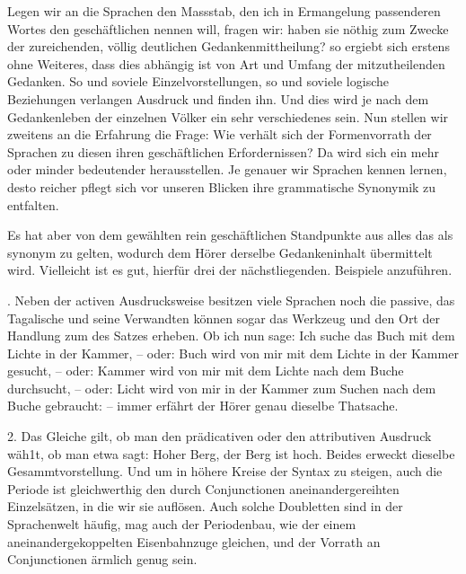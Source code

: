 Legen wir an die Sprachen den Massstab, den ich in Ermangelung  passenderen Wortes den geschäftlichen nennen will, fragen wir:  haben \label{sp.363} sie nöthig zum Zwecke der zureichenden, völlig deutlichen Gedankenmittheilung? so ergiebt sich erstens ohne Weiteres, dass dies abhängig ist von Art und Umfang der mitzutheilenden Gedanken. So und soviele Einzelvorstellungen, so und soviele logische Beziehungen verlangen Ausdruck und finden ihn. Und dies  wird je nach dem Gedankenleben der einzelnen Völker ein sehr verschiedenes sein. Nun stellen wir zweitens an die Erfahrung die Frage: Wie verhält sich der Formenvorrath der Sprachen zu diesen ihren geschäftlichen Erfordernissen? Da wird sich ein mehr oder minder bedeutender  herausstellen. Je genauer wir Sprachen kennen lernen, desto reicher pflegt sich vor unseren Blicken ihre grammatische Synonymik zu entfalten.

Es hat aber von dem gewählten rein geschäftlichen Standpunkte aus alles das als synonym zu gelten, wodurch dem Hörer derselbe Gedankeninhalt übermittelt wird. Vielleicht ist es gut, hierfür drei der nächstliegenden. Beispiele anzuführen.

. Neben der activen Ausdrucksweise besitzen viele Sprachen noch die passive, das Tagalische und seine Verwandten können sogar das Werkzeug und den Ort der Handlung zum  des Satzes erheben. Ob ich nun sage: Ich suche das Buch mit dem Lichte in der Kammer, – oder:  Buch wird von mir mit dem Lichte in der Kammer gesucht, – oder:  Kammer wird von mir mit dem Lichte nach dem Buche durchsucht, – oder:  Licht wird von mir in der Kammer zum Suchen nach dem Buche gebraucht: – immer erfährt der Hörer genau dieselbe Thatsache.

2. Das Gleiche gilt, ob man den prädicativen oder den attributiven Ausdruck wäh1t, ob man etwa sagt: Hoher Berg,  der Berg ist hoch. Beides erweckt dieselbe Gesammtvorstellung. Und um in höhere Kreise der Syntax zu steigen,  auch die Periode ist gleichwerthig den durch Conjunctionen aneinandergereihten Einzelsätzen, in die wir sie auflösen. Auch solche Doubletten sind in der Sprachenwelt häufig, mag auch der Periodenbau, wie der  einem aneinandergekoppelten Eisenbahnzuge gleichen, und der Vorrath an Conjunctionen ärmlich genug sein.



